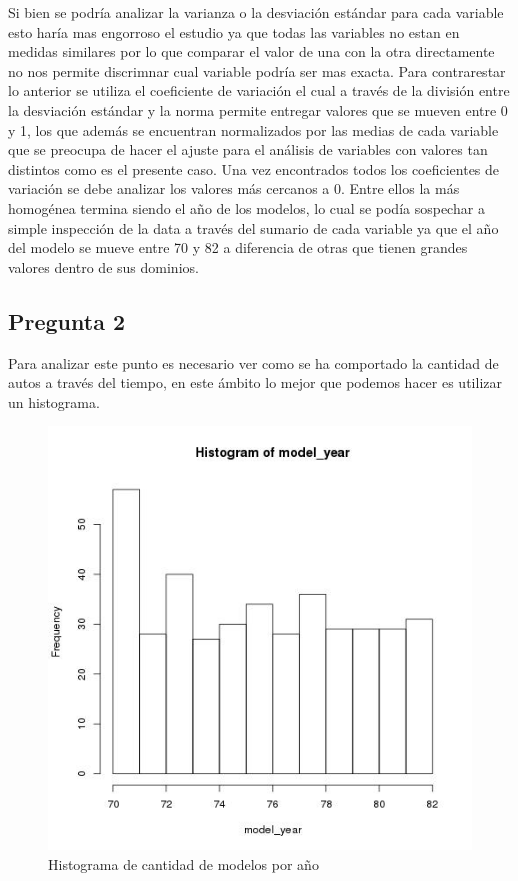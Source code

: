 \documentclass[letter,10pt]{article}
\begin{document}
Si bien se podría analizar la varianza o la desviación estándar para cada variable esto haría mas engorroso el estudio ya que
todas las variables no estan en medidas similares por lo que comparar el valor de una con la otra directamente no nos permite discrimnar
cual variable podría ser mas exacta. Para contrarestar lo anterior se utiliza el coeficiente de variación el cual a través de la división
entre la desviación estándar y la norma permite entregar valores que se mueven entre 0 y 1, los que además se encuentran normalizados
por las medias de cada variable que se preocupa de hacer el ajuste para el análisis de variables con valores tan distintos como es el presente caso.
Una vez encontrados todos los coeficientes de variación se debe analizar los valores más cercanos a 0. Entre ellos la más homogénea
termina siendo el año de los modelos, lo cual se podía sospechar a simple inspección de la data a través del sumario de cada variable
ya que el año del modelo se mueve entre 70 y 82 a diferencia de otras que tienen grandes valores dentro de sus dominios.


\subsection{Pregunta 2}

Para analizar este punto es necesario ver como se ha comportado la cantidad de autos a través del tiempo,
en este ámbito lo mejor que podemos hacer es utilizar un histograma.

\begin{figure}[h!]
    \centering
    \includegraphics[scale=0.4]{model_year_histogram.jpg}
    \caption{Histograma de cantidad de modelos por año}
    \label{fig:model_year_histogram}
\end{figure}
\end{document}
